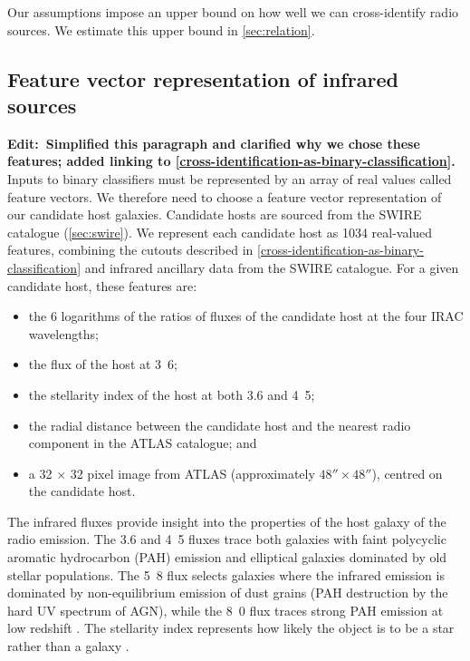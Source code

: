 \documentclass[fleqn,usenatbib,usedcolumn]{mnras}
\newcommand{\edit}[1]{{\bf Edit:~{#1}}}
\begin{document}
    Our assumptions impose an upper bound on how well we can cross-identify
    radio sources. We estimate this upper bound in \autoref{sec:relation}.

  \subsection{Feature vector representation of infrared sources}
  \label{vector-representation-of-infrared-sources}

    \edit{Simplified this paragraph and clarified why we chose these features; added linking to \autoref{cross-identification-as-binary-classification}.} Inputs to binary classifiers must be represented by an array of real values called feature vectors. We therefore need to choose a feature vector representation of our candidate host galaxies. Candidate hosts are sourced from the SWIRE catalogue (\autoref{sec:swire}). We represent each candidate host as 1034 real-valued features, combining the cutouts described in \autoref{cross-identification-as-binary-classification} and infrared ancillary data from the SWIRE catalogue. For a given candidate host, these features are:
    \begin{itemize}
      \item the 6 logarithms of the ratios of fluxes of the candidate
        host at the four IRAC wavelengths;
      \item the flux of the host at \unit{3.6}{\micro\meter};
      \item the stellarity index of the host at both 3.6 and
        \unit{4.5}{\micro\meter};
      \item the radial distance between the candidate host and the nearest
        radio component in the ATLAS catalogue; and
      \item a 32 $\times$ 32 pixel image from ATLAS (approximately $48''
        \times 48''$), centred on the candidate host.
    \end{itemize}

    The infrared fluxes provide insight into the properties of the host galaxy of the radio emission. The 3.6 and \unit{4.5}{\micro\meter} fluxes trace both galaxies with faint polycyclic aromatic hydrocarbon (PAH) emission and elliptical galaxies dominated by old stellar populations. The \unit{5.8}{\micro\meter} flux selects galaxies where the infrared emission is dominated by non-equilibrium emission of dust grains (PAH destruction
    by the hard UV spectrum of AGN), while the \unit{8.0}{\micro\meter} flux traces strong PAH emission at low redshift \citep{Sajina2005}. The stellarity index represents how likely the object is to be a star rather than a galaxy \citep{surace05swire}.
\end{document}
